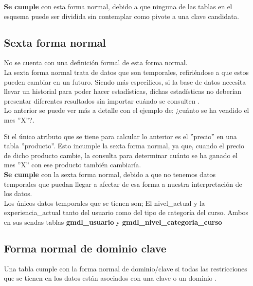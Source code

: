     \noindent \textbf{Se cumple} con esta forma normal, debido a que ninguna de las tablas en el esquema puede ser dividida sin contemplar como pivote a una clave candidata.
    
    
\clearpage
\subsection*{Sexta forma normal}
    
    No se cuenta con una definición formal de esta forma normal.\\
    
    \noindent La sexta forma normal trata de datos que son temporales, refiriéndose a que estos pueden cambiar en un futuro. Siendo más específicos, si la base de datos necesita llevar un historial para poder hacer estadísticas, dichas estadísticas no deberían presentar diferentes resultados sin importar cuándo se consulten \cite[pág. 125-126]{libroBaseDeDatosInglesCuarteEnAdelante}.\\
    
    \noindent Lo anterior se puede ver más a detalle con el ejemplo de; ¿cuánto se ha vendido el mes ''X''?.
    
    \noindent Si el único atributo que se tiene para calcular lo anterior es el ''precio'' en una tabla ''producto''. Esto incumple la sexta forma normal, ya que, cuando el precio de dicho producto cambie, la consulta para determinar cuánto se ha ganado el mes ''X'' con ese producto también cambiaría.\\
    
    
    \noindent \textbf{Se cumple} con la sexta forma normal, debido a que no tenemos datos temporales que puedan llegar a afectar de esa forma a nuestra interpretación de los datos. \\
    
    \noindent Los únicos datos temporales que se tienen son; El nivel\_actual y la experiencia\_actual tanto del usuario como del tipo de categoría del curso. Ambos en sus sendas tablas \textbf{gmdl\_usuario} y \textbf{gmdl\_nivel\_categoria\_curso}
    
    
\subsection*{Forma normal de dominio clave}

    Una tabla cumple con la forma normal de dominio/clave si todas las restricciones que se tienen en los datos están asociados con una clave o un dominio \cite[p. 193]{libroBaseDeDatosIngles}.
    
